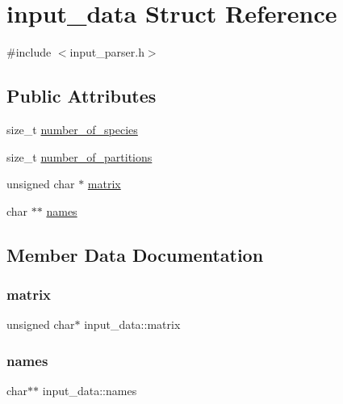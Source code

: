 \hypertarget{structinput__data}{}\section{input\+\_\+data Struct Reference}
\label{structinput__data}


{\ttfamily \#include $<$input\+\_\+parser.\+h$>$}

\subsection*{Public Attributes}
\begin{DoxyCompactItemize}
\item 
size\+\_\+t \hyperlink{structinput__data_a10d4f562a6b9dbda373a6fbe9a99e9fe}{number\+\_\+of\+\_\+species}
\item 
size\+\_\+t \hyperlink{structinput__data_ae07405c95174763dd88371d85b6d35a3}{number\+\_\+of\+\_\+partitions}
\item 
unsigned char $\ast$ \hyperlink{structinput__data_adb15938eeec23b8e78af79c8379f8432}{matrix}
\item 
char $\ast$$\ast$ \hyperlink{structinput__data_a3e32e1d152e8c5d245f2ef4fb348a575}{names}
\end{DoxyCompactItemize}


\subsection{Member Data Documentation}
\mbox{\label{structinput__data_adb15938eeec23b8e78af79c8379f8432}} 
\subsubsection{\texorpdfstring{matrix}{matrix}}
{\footnotesize\ttfamily unsigned char$\ast$ input\+\_\+data\+::matrix}

\mbox{\label{structinput__data_a3e32e1d152e8c5d245f2ef4fb348a575}} 
\subsubsection{\texorpdfstring{names}{names}}
{\footnotesize\ttfamily char$\ast$$\ast$ input\+\_\+data\+::names}

